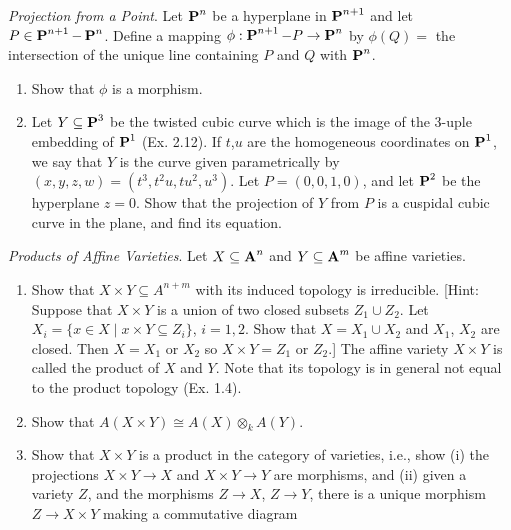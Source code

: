 \documentclass[10pt]{amsart}
\begin{document}
\begin{exercise}[3.14]
    \emph{Projection from a Point}. Let $\pp^n$ be a hyperplane in $\pp^{n+1}$ and let $P \in \pp^{n+1} - \pp^n$. 
    Define a mapping $\phi : \pp^{n+ 1} - P \to \pp^n$ by $\phi(Q) = $ the intersection of the unique line containing $P$ and $Q$ 
    with $\pp^n$.
    \begin{enumerate}[itemsep=2pt]
        \item Show that $\phi$ is a morphism.
        \item Let $Y \subseteq \pp^3$ be the twisted cubic curve which is the image of the 
        3-uple embedding of $\pp^1$ (Ex. 2.12). If $t$,$u$ are the homogeneous coordinates on $\pp^1$, 
        we say that $Y$ is the curve given parametrically by $(x,y,z,w) = (t^3,t^2u,tu^2,u^3)$. 
        Let $P = (0,0,1,0)$, and let $\pp^2$ be the hyperplane $z = 0$. Show that the projection of 
        $Y$ from $P$ is a cuspidal cubic curve in the plane, and find its equation.
    \end{enumerate}
\end{exercise}


\begin{exercise}[3.15]
    \emph{Products of Affine Varieties}. Let $X \subseteq \aa^n$ and $Y \subseteq \aa^m$ be affine varieties.
    \begin{enumerate}[itemsep=2pt]
        \item Show that $X \times Y \subseteq A^{n+m}$ with its induced topology is irreducible. 
        [Hint: Suppose that $X \times Y$ is a union of two closed subsets $Z_1 \cup Z_2$. Let 
        $X_i = \{x \in X \mid x \times Y \subseteq Z_i\}$, $i = 1,2$. 
        Show that $X = X_1 \cup X_2$ and $X_1$, $X_2$ are closed. Then $X = X_1$ or $X_2$ so $X \times Y = Z_1$ or $Z_2$.] 
        The affine variety $X \times Y$ is called the product of $X$ and $Y$. Note that its topology is in general
        not equal to the product topology (Ex. 1.4).
        \item Show that $A(X \times Y) \cong A(X) \otimes_k A(Y)$.
        \item Show that $X \times Y$ is a product in the category of varieties, i.e., show (i) the
        projections $X \times Y \to X$ and $X \times Y \to Y$ are morphisms, and (ii) given a variety $Z$, 
        and the morphisms $Z \to X$, $Z \to Y$, there is a unique morphism $Z \to X \times Y$ making a commutative 
        diagram 
        \begin{center}
        \end{center}
    \end{enumerate}
\end{exercise}
\end{document}
